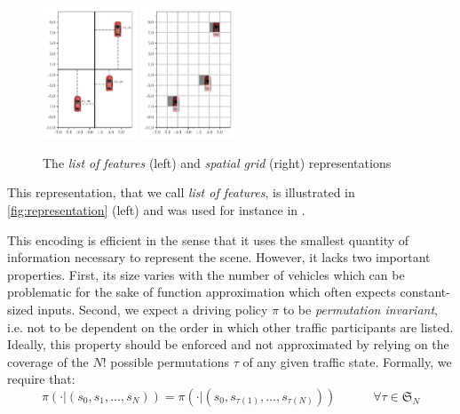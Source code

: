 \documentclass{article}
\begin{document}
\begin{figure}[tp]
	\centering
	\includegraphics[width=0.25\textwidth]{img/coordinates}
	\includegraphics[width=0.25\textwidth]{img/map}
	\caption{The \emph{list of features} (left) and \emph{spatial grid} (right) representations}
	\label{fig:representation}
\end{figure}

This representation, that we call \emph{list of features}, is illustrated in \autoref{fig:representation} (left) and was used for instance in \citep{Bai2015, Gindele2015, Song2016, Sunberg2017, Paxton2017, Galceran2017, Chen2017}.


This encoding is efficient in the sense that it uses the smallest quantity of information necessary to represent the scene. However, it lacks two important properties. First, its size varies with the number of vehicles which can be problematic for the sake of function approximation which often expects constant-sized inputs. Second, we expect a driving policy $\pi$ to be \emph{permutation invariant}, i.e. not to be dependent on the order in which other traffic participants are listed. Ideally, this property should be enforced and not approximated by relying on the coverage of the $N!$ possible permutations $\tau$ of any given traffic state. Formally, we require that:
\begin{equation}
\label{eq:permutation}
\pi(\cdot|(s_0, s_1,\dotsc,s_N)) = \pi(\cdot|(s_0, s_{\tau(1)},\dotsc,s_{\tau(N)})) \quad\quad\quad \forall\tau \in \mathfrak{S}_N
\end{equation}
\end{document}

